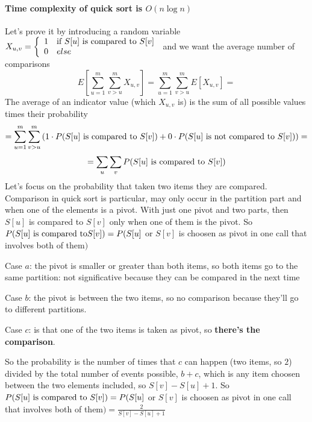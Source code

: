 \documentclass[10pt]{report}
\begin{document}
\paragraph{Time complexity of quick sort is $O(n\log n)$} Let's prove it by introducing a random variable\\ $X_{u,v} = \left\{\begin{array}{c l}
1&\hbox{if }S[u]\hbox{ is compared to }S[v]\\0&else
\end{array}\right.$ and we want the average number of comparisons $$E\left[\sum_{u=1}^m\sum_{v>u}^m X_{u,v}\right] = \sum_{u=1}^m\sum_{v>u}^m E\left[X_{u,v}\right] = $$
The average of an indicator value (which $X_{u,v}$ is) is the sum of all possible values times their probability $$= \sum_{u=1}^m\sum_{v>u}^m \left(1\cdot P(S[u]\hbox{ is compared to }S[v]) + 0\cdot P(S[u]\hbox{ is not compared to }S[v])\right) = $$
$$=\sum_u \sum_v P(S[u]\hbox{ is compared to }S[v])$$
Let's focus on the probability that taken two items they are compared. Comparison in quick sort is particular, may only occur in the partition part and when one of the elements is a pivot. With just one pivot and two parts, then $S[u]$ is compared to $S[v]$ only when one of them is the pivot. So $P(S[u]\hbox{ is compared to}S[v]) = P(S[u]$ or $S[v]$ is choosen as pivot in one call that involves both of them$)$
\begin{list}{}{}
	\item Case $a$: the pivot is smaller or greater than both items, so both items go to the same partition: not significative because they can be compared in the next time 
	\item Case $b$: the pivot is between the two items, so no comparison because they'll go to different partitions.
	\item Case $c$: is that one of the two items is taken as pivot, so \textbf{there's the comparison}.
\end{list}
So the probability is the number of times that $c$ can happen (two items, so $2$) divided by the total number of events possible, $b + c$, which is any item choosen between the two elements included, so $S[v] - S[u] + 1$. So $P(S[u]\hbox{ is compared to }S[v]) = P(S[u]$ or $S[v]$ is choosen as pivot in one call that involves both of them$) = \frac{2}{S[v] - S[u] + 1}$\\
\end{document}
